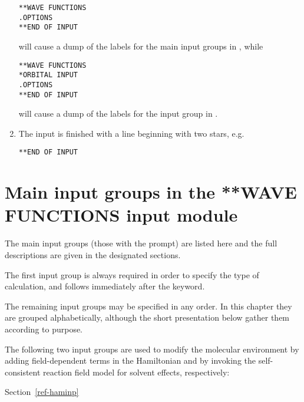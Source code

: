 \begin{enumerate}
{\begin{inputex} \begin{verbatim}
**WAVE FUNCTIONS
.OPTIONS
**END OF INPUT
\end{verbatim} \end{inputex}
   will cause a dump of the labels for the main input groups in {\sir},
   while

\begin{inputex} \begin{verbatim}
**WAVE FUNCTIONS
*ORBITAL INPUT
.OPTIONS
**END OF INPUT
\end{verbatim} \end{inputex}
   will cause a dump of the labels for the  input group
   in {\sir}.
}
\item{ The {\sir} input is finished with a line beginning with two stars,
   e.g.

\begin{inputex} \begin{verbatim}
**END OF INPUT
\end{verbatim} \end{inputex}
}
\end{enumerate}


\pagebreak[3]
\section{\label{sec:ref-newinp}
   Main input groups in the **WAVE FUNCTIONS input module}

\noindent
The main input groups (those with the {\starkey} prompt) are listed here and
the full descriptions are given in the designated sections.

\noindent
The first input group is always required in order to specify the type of
calculation, and follows immediately after the 
keyword.


\noindent The remaining input groups may be specified in any
order. In this chapter they are grouped alphabetically, although
the short presentation below gather them according to purpose.

\ifsolvent
The following two input groups are used to modify the
molecular environment by adding field-dependent
terms in the Hamiltonian and by invoking
the self-consistent reaction field model for solvent
effects, respectively:

Section~\ref{ref-haminp} 


